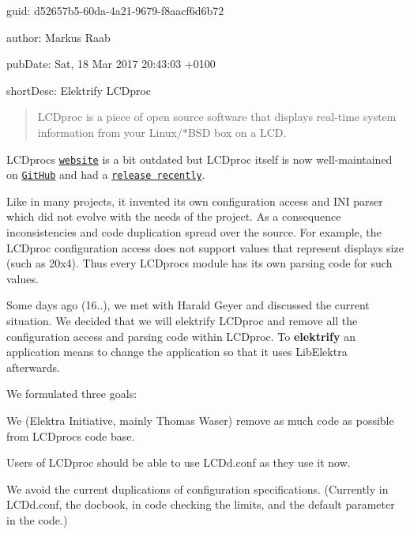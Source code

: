 
\begin{DoxyItemize}
\item guid\+: d52657b5-\/60da-\/4a21-\/9679-\/f8aacf6d6b72
\item author\+: Markus Raab
\item pub\+Date\+: Sat, 18 Mar 2017 20\+:43\+:03 +0100
\item short\+Desc\+: Elektrify L\+C\+Dproc
\end{DoxyItemize}

\begin{quote}
L\+C\+Dproc is a piece of open source software that displays real-\/time system information from your {\ttfamily Linux}/{\ttfamily $\ast$\+B\+SD} box on a L\+CD. \end{quote}


L\+C\+Dproc\textquotesingle{}s \href{http://lcdproc.omnipotent.net/}{\tt website} is a bit outdated but L\+C\+Dproc itself is now well-\/maintained on \href{https://github.com/lcdproc/lcdproc}{\tt Git\+Hub} and had a \href{https://github.com/lcdproc/lcdproc/releases}{\tt release recently}.

Like in many projects, it invented its own configuration access and I\+NI parser which did not evolve with the needs of the project. As a consequence inconsistencies and code duplication spread over the source. For example, the L\+C\+Dproc configuration access does not support values that represent display\textquotesingle{}s size (such as {\ttfamily 20x4}). Thus every L\+C\+Dproc\textquotesingle{}s module has its own parsing code for such values.

Some days ago (16..), we met with Harald Geyer and discussed the current situation. We decided that we will elektrify L\+C\+Dproc and remove all the configuration access and parsing code within L\+C\+Dproc. To {\bfseries elektrify} an application means to change the application so that it uses Lib\+Elektra afterwards.

We formulated three goals\+:


\begin{DoxyEnumerate}
\item We (Elektra Initiative, mainly Thomas Waser) remove as much code as possible from L\+C\+Dproc\textquotesingle{}s code base.
\item Users of L\+C\+Dproc should be able to use {\ttfamily L\+C\+Dd.\+conf} as they use it now.
\item We avoid the current duplications of configuration specifications. (Currently in {\ttfamily L\+C\+Dd.\+conf}, the docbook, in code checking the limits, and the default parameter in the code.)
\end{DoxyEnumerate}

